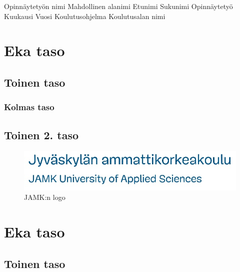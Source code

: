\documentclass{jamk}
\begin{document}
\makejamktitle
    {Opinnäytetyön nimi}     %
    {Mahdollinen alanimi}    %
    {Etunimi Sukunimi}{}{}{} %
    {Opinnäytetyö}           %
    {Kuukausi Vuosi}         %
    {Koulutusohjelma}        %
    {Koulutusalan nimi}      %

\section{Eka taso}
\lipsum[1]
\lipsum[2]

\subsection{Toinen taso}
\subsubsection{Kolmas taso}
\lipsum[1]
\lipsum[2]
\lipsum[3]
\lipsum[4]

\subsection{Toinen 2. taso}
\lipsum[1]
\begin{figure}
  \includegraphics{jamkfi_long.png}
  \caption{JAMK:n logo}
\end{figure}
\lipsum[2]
\lipsum[3]

\section{Eka taso}
\lipsum[1]

\subsection{Toinen taso}
\lipsum[1]
\lipsum[2]
\lipsum[3]
\end{document}
